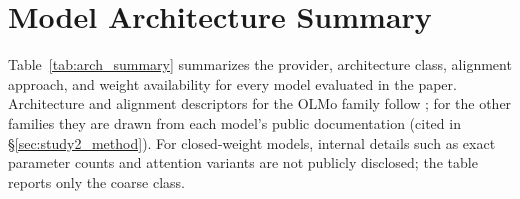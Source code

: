 \documentclass{article}
\begin{document}
\FloatBarrier

\section{Model Architecture Summary}
\label{app:architectures}

Table~\ref{tab:arch_summary} summarizes the provider, architecture class, alignment approach, and weight availability for every model evaluated in the paper. Architecture and alignment descriptors for the OLMo family follow \citet{olmo3}; for the other families they are drawn from each model's public documentation (cited in \S\ref{sec:study2_method}). For closed-weight models, internal details such as exact parameter counts and attention variants are not publicly disclosed; the table reports only the coarse class.
\end{document}
